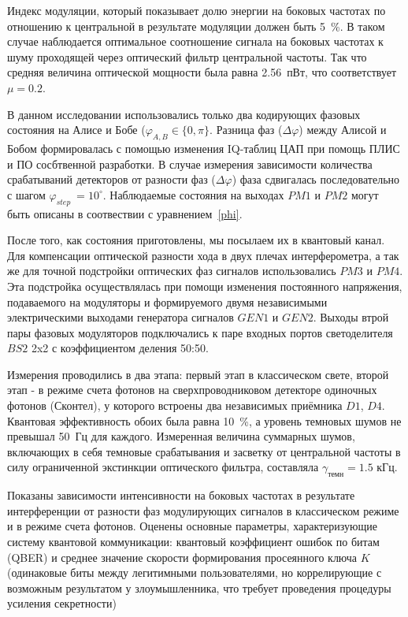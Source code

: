 Индекс модуляции, который показывает долю энергии на боковых частотах по отношению к центральной в результате модуляции должен быть 5~\%. В таком случае наблюдается оптимальное соотношение сигнала на боковых частотах к шуму проходящей через оптический фильтр центральной частоты.  Так что средняя величина оптической мощности была равна 2.56~пВт, что соответствует $\mu=0.2$.  


В данном исследовании  использовались только два кодирующих фазовых состояния на Алисе и Бобе ($\varphi_{A,B}\in\{0,\pi\}$. Разница фаз ($\Delta\varphi$) между Алисой и Бобом формировалась с помощью изменения IQ-таблиц ЦАП при помощь ПЛИС и ПО сосбтвенной разработки. В случае измерения зависимости количества срабатываний детекторов от разности фаз ($\Delta\varphi$) фаза сдвигалась последовательно с шагом $\varphi_{step}\ = 10^{\circ}$. Наблюдаемые состояния на выходах $PM1$ и $PM2$ могут быть описаны в соотвествии с уравнением~\ref{phi}.

После того, как состояния приготовлены, мы посылаем их в квантовый канал. Для компенсации оптической разности хода в двух плечах интерферометра, а так же для точной подстройки оптических фаз сигналов использовались $PM3$ и $PM4$. Эта подстройка осуществлялась при помощи изменения постоянного напряжения, подаваемого на модуляторы и формируемого двумя независимыми электрическими выходами генератора сигналов $GEN1$ и $GEN2$. Выходы втрой пары фазовых модуляторов подключались к паре входных портов светоделителя $BS2$ 2x2 с коэффициентом деления 50:50.

Измерения проводились в два этапа: первый этап в классическом свете, второй этап - в режиме счета фотонов на сверхпроводниковом детекторе одиночных фотонов (Сконтел), у которого встроены два независимых приёмника $D1$, $D4$. Квантовая эффективность обоих была равна 10~\%, а уровень темновых шумов не превышал 50~Гц для каждого. Измеренная величина суммарных шумов, включающих в себя темновые срабатывания и засветку от центральной частоты в силу ограниченной экстинкции оптического фильтра, составляла $\gamma_{темн}=1.5$ кГц.

Показаны зависимости интенсивности на боковых частотах в результате интерференции от разности фаз модулирующих сигналов в классическом режиме и в режиме счета фотонов. Оценены основные параметры, характеризующие систему квантовой коммуникации: квантовый коэффициент ошибок по битам (QBER) и среднее значение скорости формирования просеянного ключа $K$ (одинаковые биты между легитимными пользователями, но коррелирующие с возможным результатом у злоумышленника, что требует проведения процедуры усиления секретности) 



